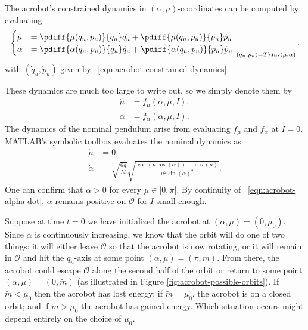 The acrobot's constrained dynamics in
\((\alpha,\mu)\)-coordinates can be computed by evaluating
\begin{equation*}
\left.\begin{cases}
    \dot{\mu} &= \pdiff{\mu(q_u,p_u)}{q_u}\dot{q_u} +
         \pdiff{\mu(q_u,p_u)}{p_u}\dot{p}_u
    \\
    \dot{\alpha} &= \pdiff{\alpha(q_u,p_u)}{q_u}\dot{q}_u + 
        \pdiff{\alpha(q_u,p_u)}{p_u}\dot{p}_u
    \end{cases}\right|_{(q_u,p_u) = T\inv(\mu,\alpha)}
    .
\end{equation*}
with \((\dot{q}_u,\dot{p}_u)\) given by 
 ~\eqref{eqn:acrobot-constrained-dynamics}.

These dynamics are much too large to write out, so we simply denote them by
\begin{align}\label{eqn:acrobot-mu-dot}
    \dot{\mu} &= f_\mu(\alpha,\mu,I)
    ,\\
    \label{eqn:acrobot-alpha-dot}
    \dot{\alpha} &= f_\alpha(\alpha,\mu,I)
    .
\end{align}
The dynamics of the nominal pendulum arise from evaluating
\(f_\mu\) and \(f_\alpha\) at \(I = 0\).
MATLAB's symbolic toolbox evaluates the nominal dynamics as
\begin{align}\label{eqn:acrobot-mu-dot-nom}
    \dot{\mu} &= 0
    , \\
    \label{eqn:acrobot-alpha-dot-nom}
    \dot{\alpha} &= \sqrt{\frac{6g}{5l}} 
        \sqrt{\frac{\cos(\mu\cos(\alpha)) - \cos(\mu)}
            {\mu^2 \sin(\alpha)^2}}
    .
\end{align}
One can confirm that \(\dot{\alpha} > 0\) for every \(\mu \in ]0,\pi[\).
By continuity of ~\eqref{eqn:acrobot-alpha-dot}, 
\(\dot{\alpha}\) remains positive on \(\mathcal{O}\) for \(I\) small enough.

Suppose at time \(t = 0\) we have initialized the acrobot at \((\alpha,\mu) = (0,\mu_0)\).
Since \(\alpha\) is continuously increasing, we know that the orbit will do one
of two things: it will either leave \(\mathcal{O}\) so that the acrobot is now rotating,
or it will remain in \(\mathcal{O}\) and hit the \(q_u\)-axis at some point 
\((\alpha,\mu) = (\pi,m)\).
From there, the acrobot could escape \(\mathcal{O}\) along the second half of the orbit or
return to some point \((\alpha,\mu) = (0,\tilde{m})\) (as illustrated in Figure
\ref{fig:acrobot-possible-orbits}).
If \(\tilde{m} < \mu_0\) then the acrobot has lost energy; 
if \(\tilde{m} = \mu_0\), the acrobot is on a closed orbit;
and if \(\tilde{m} > \mu_0\) the acrobot has gained energy.
Which situation occurs might depend entirely on the choice of
\(\mu_0\).

